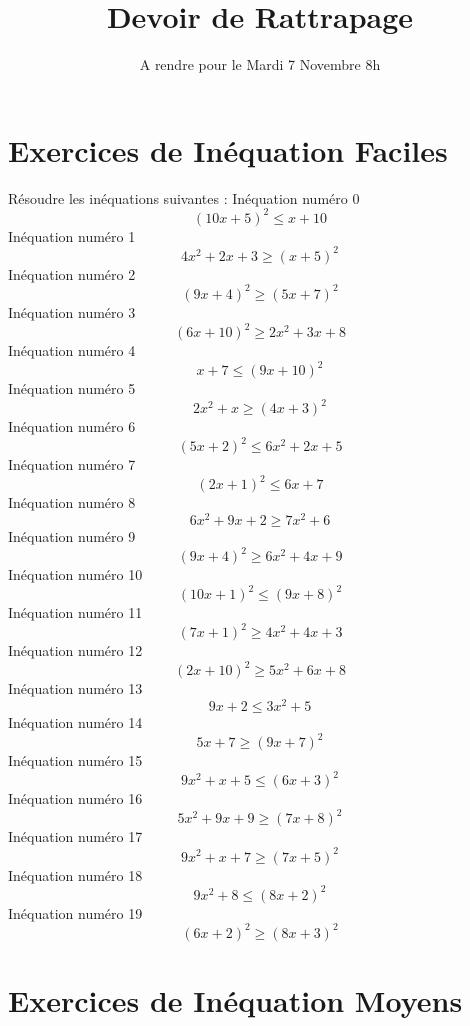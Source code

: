 \documentclass{article}
\title{Devoir de Rattrapage}
\date{A rendre pour le Mardi 7 Novembre 8h}\usepackage{natbib}
\begin{document}
\maketitle
 \section{Exercices de In\'equation Faciles}

 R\'esoudre les in\'equations suivantes : 
In\'equation num\'ero 0 \[\left(10 x + 5\right)^{2} \leq x + 10\]In\'equation num\'ero 1 \[4 x^{2} + 2 x + 3 \geq \left(x + 5\right)^{2}\]In\'equation num\'ero 2 \[\left(9 x + 4\right)^{2} \geq \left(5 x + 7\right)^{2}\]In\'equation num\'ero 3 \[\left(6 x + 10\right)^{2} \geq 2 x^{2} + 3 x + 8\]In\'equation num\'ero 4 \[x + 7 \leq \left(9 x + 10\right)^{2}\]In\'equation num\'ero 5 \[2 x^{2} + x \geq \left(4 x + 3\right)^{2}\]In\'equation num\'ero 6 \[\left(5 x + 2\right)^{2} \leq 6 x^{2} + 2 x + 5\]In\'equation num\'ero 7 \[\left(2 x + 1\right)^{2} \leq 6 x + 7\]In\'equation num\'ero 8 \[6 x^{2} + 9 x + 2 \geq 7 x^{2} + 6\]In\'equation num\'ero 9 \[\left(9 x + 4\right)^{2} \geq 6 x^{2} + 4 x + 9\]In\'equation num\'ero 10 \[\left(10 x + 1\right)^{2} \leq \left(9 x + 8\right)^{2}\]In\'equation num\'ero 11 \[\left(7 x + 1\right)^{2} \geq 4 x^{2} + 4 x + 3\]In\'equation num\'ero 12 \[\left(2 x + 10\right)^{2} \geq 5 x^{2} + 6 x + 8\]In\'equation num\'ero 13 \[9 x + 2 \leq 3 x^{2} + 5\]In\'equation num\'ero 14 \[5 x + 7 \geq \left(9 x + 7\right)^{2}\]In\'equation num\'ero 15 \[9 x^{2} + x + 5 \leq \left(6 x + 3\right)^{2}\]In\'equation num\'ero 16 \[5 x^{2} + 9 x + 9 \geq \left(7 x + 8\right)^{2}\]In\'equation num\'ero 17 \[9 x^{2} + x + 7 \geq \left(7 x + 5\right)^{2}\]In\'equation num\'ero 18 \[9 x^{2} + 8 \leq \left(8 x + 2\right)^{2}\]In\'equation num\'ero 19 \[\left(6 x + 2\right)^{2} \geq \left(8 x + 3\right)^{2}\]
 \section{Exercices de In\'equation Moyens}
\end{document}
